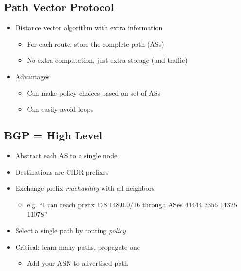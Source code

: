 \subsection{Path Vector Protocol}
\begin{itemize}[nosep]
    \item Distance vector algorithm with extra information
          \begin{itemize}[nosep]
              \item For each route, store the complete path (ASs)
              \item No extra computation, just extra storage (and traffic)
          \end{itemize}
    \item Advantages
          \begin{itemize}[nosep]
              \item Can make policy choices based on set of ASs
              \item Can easily avoid loops
          \end{itemize}
\end{itemize}

\begin{figure}[H]
\end{figure}
\subsection{BGP = High Level}
\begin{itemize}[nosep]
    \item Abstract each AS to a single node
    \item Destinations are CIDR prefixes
    \item Exchange prefix \emph{reachability} with all neighbors
          \begin{itemize}[nosep]
              \item e.g. ``I can reach prefix 128.148.0.0/16 through ASes 44444 3356 14325 11078''
          \end{itemize}
    \item Select a single path by routing \emph{policy}
    \item Critical: learn many paths, propagate one
          \begin{itemize}[nosep]
              \item Add your ASN to advertised path
          \end{itemize}
\end{itemize}

